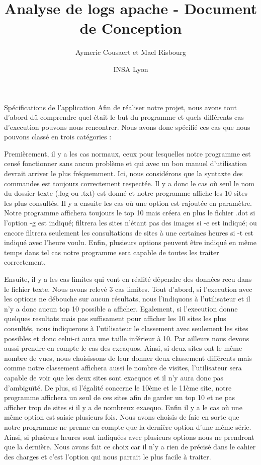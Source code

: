 \documentclass{article}
\date{INSA Lyon}
\title{Analyse de logs apache - Document de Conception}
\author{Aymeric Cousaert et Mael Risbourg}
\begin{document}
\maketitle

\vspace{1cm}
\tableofcontents
\vspace{1cm}

\begin{section}{Spécifications de l'application}
Afin de réaliser notre projet, nous avons tout d'abord dû comprendre quel était le but du programme et quels différents cas d'execution pouvons nous rencontrer. Nous avons donc spécifié ces cas  que nous pouvons classé en trois catégories :

Premièrement, il y a les cas normaux, ceux pour lesquelles notre programme est censé fonctionner sans aucun problème et qui avec un bon manuel d'utilisation devrait arriver le plus fréquemment. Ici, nous considérons que la syntaxte des commandes est toujours correctement respectée. Il y a donc le cas où seul le nom du dossier texte (.log ou .txt) est donné et notre programme affiche les 10 sites les plus consultés. Il y a ensuite les cas où une option est rajoutée en paramètre. Notre programme affichera toujours le top 10 mais créera en plus le fichier .dot si l'option -g est indiqué; filtrera les sites n'étant pas des images si -e est indiqué; ou encore filtrera seulement les consultations de sites à une certaines heures si -t est indiqué avec l'heure voulu. Enfin, plusieurs options peuvent être indiqué en même temps dans tel cas notre programme sera capable de toutes les traiter correctement.

Ensuite, il y a les cas limites qui vont en réalité dépendre des données recu dans le fichier texte. Nous avons relevé 3 cas limites. Tout d'abord, si l'execution avec les options ne débouche sur aucun résultats, nous l'indiquons à l'utilisateur et il n'y a donc aucun top 10 possible a afficher. Egalement, si l'execution donne quelques resultats mais pas suffisament pour afficher les 10 sites les plus consultés, nous indiquerons à l'utilisateur le classement avec seulement les sites possibles et donc celui-ci aura une taille inférieur à 10. Par ailleurs nous devons aussi prendre en compte le cas des exeaquos. Ainsi, si deux sites ont le même nombre de vues, nous choisissons de leur donner deux classement différents mais comme notre classement affichera aussi le nombre de visites, l'utilisateur sera capable de voir que les deux sites sont exaequos et il n'y aura donc pas d'ambiguïté. De plus, si l'égalité concerne le 10ème et le 11ème site, notre programme affichera un seul de ces sites afin de garder un top 10 et ne pas afficher trop de sites si il y a de nombreux exaequo. Enfin il y a le cas où une même option est saisie plusieurs fois. Nous avons choisis de faie en sorte que notre programme ne prenne en compte que la dernière option d'une même série. Ainsi, si plusieurs heures sont indiquées avec plusieurs options nous ne prendront que la dernière. Nous avons fait ce choix car il n'y a rien de précisé dans le cahier des charges et c'est l'option qui nous parrait le plus facile à traiter.


\end{section}
\end{document}
